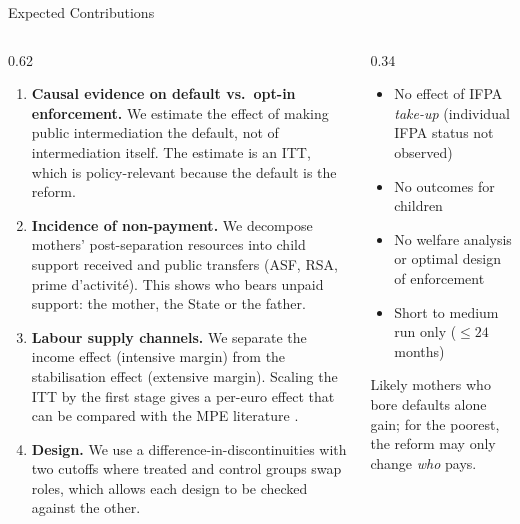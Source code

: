 \documentclass[aspectratio=169,10pt]{beamer}
\begin{document}
\begin{frame}{Expected Contributions}
\vspace{-0.2cm}
\footnotesize
\begin{columns}[T,onlytextwidth]
\begin{column}{0.62\textwidth}
\begin{enumerate}
  \setlength{\itemsep}{0.1cm}
  \justifying
  \item \textbf{Causal evidence on default vs.\ opt-in enforcement.} We estimate the effect of making public
        intermediation the default, not of intermediation itself. The estimate is an ITT, which is policy-relevant
        because the default is the reform.
  \item \textbf{Incidence of non-payment.} We decompose mothers' post-separation resources into child support received
        and public transfers (ASF, RSA, prime d'activit\'e). This shows who bears unpaid support: the mother, the State or the father.
  \item \textbf{Labour supply channels.} We separate the income effect (intensive margin) from the stabilisation effect
        (extensive margin). Scaling the ITT by the first stage gives a per-euro effect that can be compared with the MPE
        literature \textcite{golosov2024}.
  \item \textbf{Design.} We use a difference-in-discontinuities with two cutoffs where treated and control groups swap
        roles, which allows each design to be checked against the other.
\end{enumerate}
\end{column}

\begin{column}{0.34\textwidth}
\begin{keybox}
\begin{itemize}
  \setlength{\itemsep}{0.08cm}
  \item No effect of IFPA \emph{take-up} (individual IFPA status not observed)
  \item No outcomes for children
  \item No welfare analysis or optimal design of enforcement
  \item Short to medium run only ($\leq 24$ months)
\end{itemize}
\end{keybox}
\vspace{0.1cm}
\begin{keybox}
  Likely mothers who bore defaults alone gain; for the poorest, the reform may only change \emph{who} pays.
\end{keybox}
\end{column}
\end{columns}
\end{frame}
\end{document}
